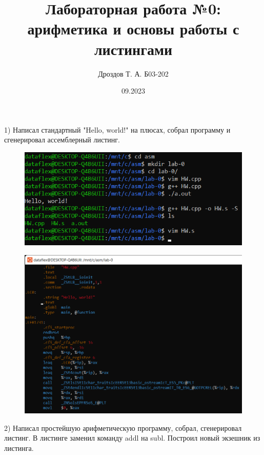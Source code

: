 \documentclass[a4paper,12pt]{article}
\title{Лабораторная работа №0: арифметика и основы работы с листингами}
\author{Дроздов Т. А. Б03-202}
\date{09.2023}
\begin{document}
 

\maketitle

1) Написал стандартный  "Hello, world!" на плюсах, собрал программу и сгенерировал ассемблерный листинг.

\begin{figure}[h] %
	\centering
	\includegraphics[width=0.8\linewidth]{command_line_asm.png}
\end{figure}


\begin{figure}[h] %
	\centering
	\includegraphics[width=0.8\linewidth]{HW s.png}
\end{figure}




\FloatBarrier

2) Написал простейшую арифметическую программу, собрал, сгенерировал листинг. В листинге заменил команду addl на subl. Построил новый экзешник из листинга.
\end{document}
